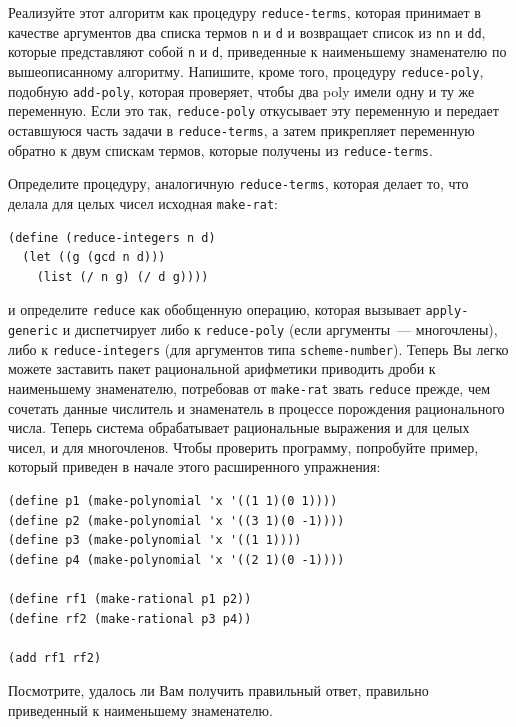 \begin{exercise}[]{2.97}\label{EX2.97}%
\begin{plainenum}
\item Реализуйте этот алгоритм как процедуру
{\tt reduce-terms}, которая принимает в качестве аргументов два
списка термов {\tt n} и {\tt d} и возвращает список
из {\tt nn} и {\tt dd}, которые представляют собой {\tt n}
и {\tt d}, приведенные к наименьшему знаменателю по
вышеописанному алгоритму.  Напишите, кроме того, процедуру
{\tt reduce-poly}, подобную {\tt add-poly}, которая
проверяет, чтобы два poly имели одну и ту же переменную.  Если это
так, {\tt reduce-poly} откусывает эту переменную и передает
оставшуюся часть задачи в {\tt reduce-terms}, а затем
прикрепляет переменную обратно к двум спискам термов, которые получены
из {\tt reduce-terms}.

\item Определите процедуру, аналогичную
{\tt reduce-terms}, которая делает то, что делала для целых
чисел исходная {\tt make-rat}:

\begin{Verbatim}[fontsize=\small]
(define (reduce-integers n d)
  (let ((g (gcd n d)))
    (list (/ n g) (/ d g))))
\end{Verbatim}
и определите {\tt reduce} как обобщенную операцию, которая
вызывает {\tt apply-generic} и диспетчирует либо к
{\tt reduce-poly} (если аргументы~---  многочлены), либо к
{\tt reduce-in\-te\-gers} (для аргументов типа
{\tt scheme-number}).  Теперь Вы легко можете заставить пакет
рациональной арифметики приводить дроби к наименьшему знаменателю,
потребовав от {\tt make-rat} звать {\tt reduce} прежде,
чем сочетать данные числитель и знаменатель в процессе порождения
рационального числа.  Теперь система обрабатывает рациональные
выражения и для целых чисел, и для многочленов.  Чтобы проверить
программу, попробуйте пример, который приведен в начале этого расширенного
упражнения:

\begin{Verbatim}[fontsize=\small]
(define p1 (make-polynomial 'x '((1 1)(0 1))))
(define p2 (make-polynomial 'x '((3 1)(0 -1))))
(define p3 (make-polynomial 'x '((1 1))))
(define p4 (make-polynomial 'x '((2 1)(0 -1))))

(define rf1 (make-rational p1 p2))
(define rf2 (make-rational p3 p4))

(add rf1 rf2)
\end{Verbatim}
Посмотрите, удалось ли Вам получить правильный ответ, правильно приведенный к
наименьшему знаменателю.
\end{plainenum}
\end{exercise}


